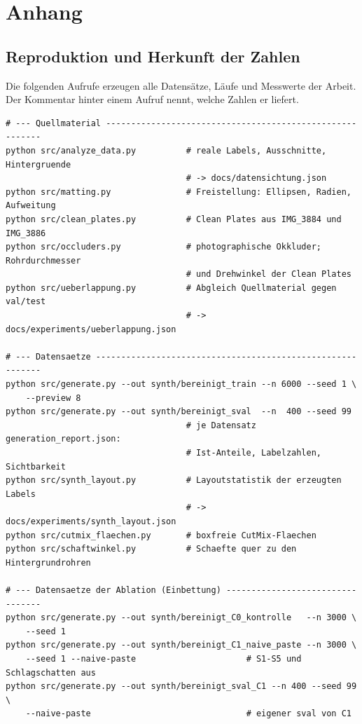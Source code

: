 \chapter{Anhang}
\label{kap:anhang}

\section{Reproduktion und Herkunft der Zahlen}
\label{sec:anhangrepro}

Die folgenden Aufrufe erzeugen alle Datensätze, Läufe und Messwerte der Arbeit.
Der Kommentar hinter einem Aufruf nennt, welche Zahlen er liefert.

\begin{footnotesize}
\begin{verbatim}
# --- Quellmaterial ---------------------------------------------------------
python src/analyze_data.py          # reale Labels, Ausschnitte, Hintergruende
                                    # -> docs/datensichtung.json
python src/matting.py               # Freistellung: Ellipsen, Radien, Aufweitung
python src/clean_plates.py          # Clean Plates aus IMG_3884 und IMG_3886
python src/occluders.py             # photographische Okkluder; Rohrdurchmesser
                                    # und Drehwinkel der Clean Plates
python src/ueberlappung.py          # Abgleich Quellmaterial gegen val/test
                                    # -> docs/experiments/ueberlappung.json

# --- Datensaetze -----------------------------------------------------------
python src/generate.py --out synth/bereinigt_train --n 6000 --seed 1 \
    --preview 8
python src/generate.py --out synth/bereinigt_sval  --n  400 --seed 99
                                    # je Datensatz generation_report.json:
                                    # Ist-Anteile, Labelzahlen, Sichtbarkeit
python src/synth_layout.py          # Layoutstatistik der erzeugten Labels
                                    # -> docs/experiments/synth_layout.json
python src/cutmix_flaechen.py       # boxfreie CutMix-Flaechen
python src/schaftwinkel.py          # Schaefte quer zu den Hintergrundrohren

# --- Datensaetze der Ablation (Einbettung) ---------------------------------
python src/generate.py --out synth/bereinigt_C0_kontrolle   --n 3000 \
    --seed 1
python src/generate.py --out synth/bereinigt_C1_naive_paste --n 3000 \
    --seed 1 --naive-paste                      # S1-S5 und Schlagschatten aus
python src/generate.py --out synth/bereinigt_sval_C1 --n 400 --seed 99 \
    --naive-paste                               # eigener sval von C1


\end{verbatim}
\end{footnotesize}
